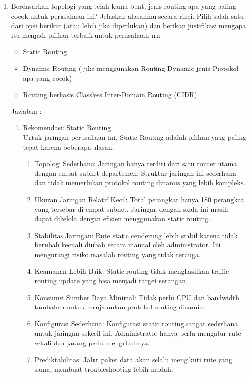 \begin{enumerate}
    \item Berdasarkan topologi yang telah kamu buat, jenis routing apa yang paling cocok untuk perusahaan ini? Jelaskan alasanmu secara rinci. Pilih salah satu dari opsi berikut (atau lebih jika diperlukan) dan berikan justifikasi mengapa itu menjadi pilihan terbaik untuk perusahaan ini:
    \begin{itemize}
        \item Static Routing
        \item Dynamic Routing ( jika menggunakan Routing Dynamic jenis Protokol apa yang cocok)
        \item Routing berbasis Classless Inter-Domain Routing (CIDR)
    \end{itemize}
    Jawaban :
    \begin{enumerate}
    \item Rekomendasi: Static Routing 
    \\Untuk jaringan perusahaan ini, Static Routing adalah pilihan yang paling tepat karena beberapa alasan:
    \begin{enumerate}
        \item Topologi Sederhana: Jaringan hanya terdiri dari satu router utama dengan empat subnet departemen. Struktur jaringan ini sederhana dan tidak memerlukan protokol routing dinamis yang lebih kompleks.
        \item Ukuran Jaringan Relatif Kecil: Total perangkat hanya 180 perangkat yang tersebar di empat subnet. Jaringan dengan skala ini masih dapat dikelola dengan efisien menggunakan static routing.
        \item Stabilitas Jaringan: Rute static cenderung lebih stabil karena tidak berubah kecuali diubah secara manual oleh administrator. Ini mengurangi risiko masalah routing yang tidak terduga.
        \item Keamanan Lebih Baik: Static routing tidak menghasilkan traffic routing update yang bisa menjadi target serangan.
        \item Konsumsi Sumber Daya Minimal: Tidak perlu CPU dan bandwidth tambahan untuk menjalankan protokol routing dinamis.
        \item Konfigurasi Sederhana: Konfigurasi static routing sangat sederhana untuk jaringan sekecil ini. Administrator hanya perlu mengatur rute sekali dan jarang perlu mengubahnya.
        \item Prediktabilitas: Jalur paket data akan selalu mengikuti rute yang sama, membuat troubleshooting lebih mudah.
    \end{enumerate}

\end{enumerate}
\end{enumerate}
